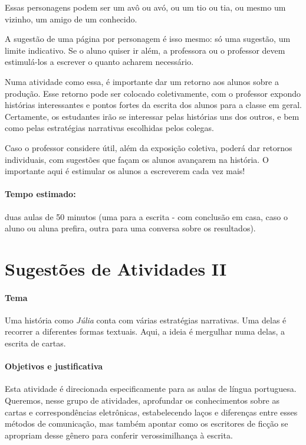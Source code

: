 \documentclass[12pt]{extarticle}
\begin{document}
Essas personagens podem ser um avô ou avó, ou um tio ou tia, ou mesmo um
vizinho, um amigo de um conhecido.

A sugestão de uma página por personagem é isso mesmo: só uma sugestão,
um limite indicativo. Se o aluno quiser ir além, a professora ou o
professor devem estimulá-los a escrever o quanto acharem necessário.

Numa atividade como essa, é importante dar um retorno aos alunos sobre a
produção. Esse retorno pode ser colocado coletivamente, com o professor
expondo histórias interessantes e pontos fortes da escrita dos alunos
para a classe em geral. Certamente, os estudantes irão se interessar
pelas histórias uns dos outros, e bem como pelas estratégias narrativas
escolhidas pelos colegas.

Caso o professor considere útil, além da exposição coletiva, poderá
dar retornos individuais, com sugestões que façam os alunos avançarem na
história. O importante aqui é estimular os alunos a escreverem cada vez
mais!

\paragraph{Tempo estimado:} duas aulas de 50 minutos (uma para a escrita -
com conclusão em casa, caso o aluno ou aluna prefira, outra para uma
conversa sobre os resultados).

\section{Sugestões de Atividades II}

\paragraph{Tema}

Uma história como \emph{Júlia} conta com várias estratégias narrativas.
Uma delas é recorrer a diferentes formas textuais. Aqui, a ideia é
mergulhar numa delas, a escrita de cartas.



\paragraph{Objetivos e justificativa}

Esta atividade é direcionada especificamente para as aulas de língua
portuguesa. Queremos, nesse grupo de atividades, aprofundar os
conhecimentos sobre as cartas e correspondências eletrônicas,
estabelecendo laços e diferenças entre esses métodos de comunicação, mas
também apontar como os escritores de ficção se apropriam desse gênero
para conferir verossimilhança à escrita.
\end{document}
